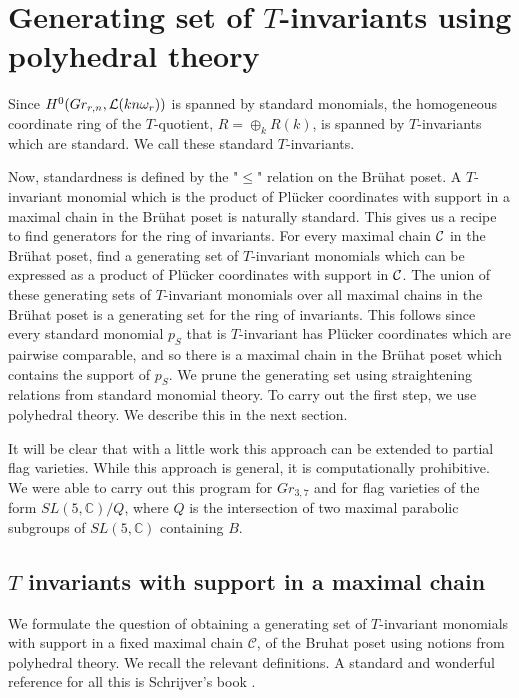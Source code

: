 \section{Generating set of $T$-invariants using polyhedral theory}
\label{hb_as_Tinv_gens}
Since $H^0(Gr_{r,n}, {\cal L}(kn\omega_r))$ is spanned by standard monomials, the homogeneous coordinate ring of the $T$-quotient, $R=\oplus_k R(k)$, is spanned by $T$-invariants which are standard. We call these standard $T$-invariants.  

Now, standardness is defined by the "$\leq$" relation on the Br\"{u}hat poset. A $T$-invariant monomial which is the product of Pl\"{u}cker coordinates with support in a maximal chain in the Br\"{u}hat poset is naturally standard.  This gives us a recipe to find generators for the ring of invariants. For every maximal chain ${\cal C}$ in the Br\"{u}hat poset, find a generating set of $T$-invariant monomials which can be expressed as a product of Pl\"{u}cker coordinates with support in ${\cal C}$. The union of these generating sets of $T$-invariant monomials over all maximal chains in the Br\"{u}hat poset is a generating set for the ring of invariants. This follows since every standard monomial $p_{S}$ that is $T$-invariant has Pl\"{u}cker coordinates which are pairwise comparable, and so there is a maximal chain in the Br\"{u}hat poset which contains the support of $p_{S}$.  We prune the generating set using straightening relations from standard monomial theory. To carry out the first step, we use polyhedral theory. We describe this in the next section.  

It will be clear that with a little work this approach can be extended to partial flag varieties.  While this approach is general, it is computationally prohibitive. We were able to carry out this program for $Gr_{3,7}$ and for flag varieties of the form $SL(5,{\mathbb C})/Q$, where $Q$ is the intersection of two maximal parabolic subgroups of $SL(5,{\mathbb C})$ containing $B$. 
\subsection{$T$ invariants with support in a maximal chain}
\label{sec:formulation}
We formulate the question of obtaining a generating set of $T$-invariant monomials with support in a fixed maximal chain ${\mathcal C}$, of the Bruhat poset using notions from polyhedral theory.  We recall the relevant definitions. A standard and wonderful reference for all this is Schrijver's book \cite{schrijver1998theory}. 

